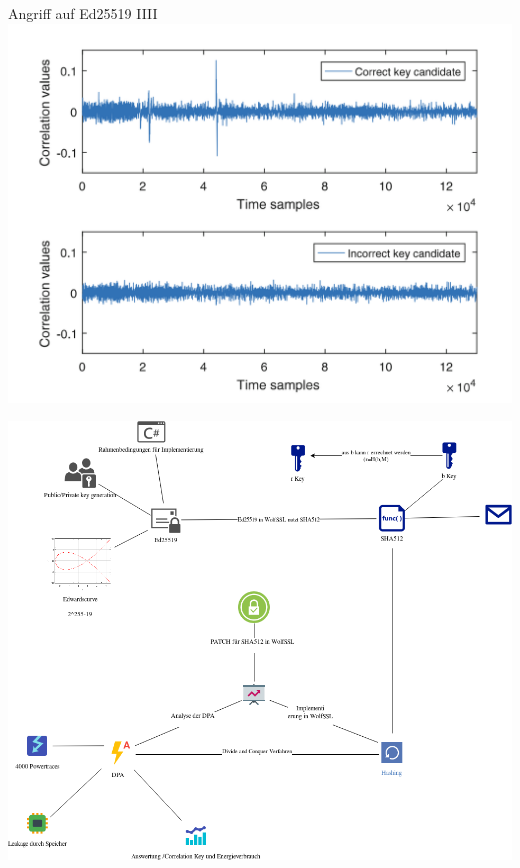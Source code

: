 \begin{frame}{Angriff auf Ed25519 IIII}
\protect\hypertarget{angriff-auf-ed25519-iiii}{}
\includegraphics[width=\textwidth,height=0.95\textheight]{Abbildungen/cvDPA.png}
\end{frame}

\begin{frame}{}
\protect\hypertarget{section-23}{}
\includegraphics{Abbildungen/ITSEC(1).png}
\end{frame}

